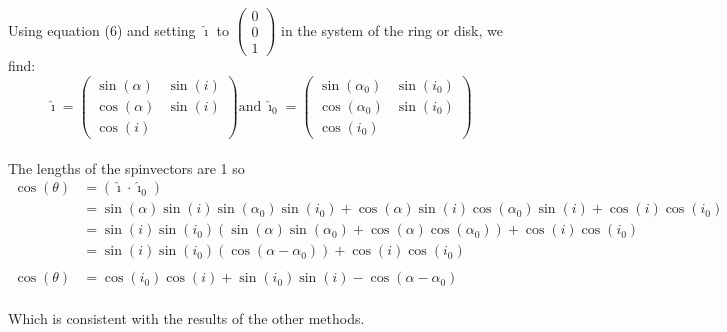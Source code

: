 \documentclass[11pt,a4paper]{article}
\newcommand{\sinb}[1]{\sin \left( #1 \right)}
\newcommand{\cosb}[1]{\cos \left( #1 \right)}
\begin{document}
Using equation (6) and setting $\hat \imath$ to $\left( \begin{array}{c}0\\0\\1\end{array}\right)$ in the system of the ring or disk, we find:\\
\begin{displaymath}
\hat \imath = \left( \begin{array}{cc}\sinb{\alpha} & \sinb{i} \\ \cosb{\alpha} & \sinb{i} \\ \cosb{i} & \end{array} \right) \mathrm{and}\  \hat \imath_0 = \left( \begin{array}{cc}\sinb{\alpha_0} & \sinb{i_0} \\ \cosb{\alpha_0} & \sinb{i_0}\\ \cosb{i_0} &
 \end{array} \right)
\end{displaymath}\\
The lengths of the spinvectors are 1 so\\
\begin{displaymath}
\begin{array}{rl}
\cosb{ \theta} &= (\hat \imath \cdot\hat \imath_0)\\
&= \sinb{\alpha} \sinb{i} \sinb{\alpha_0} \sinb{i_0} + \cosb{\alpha} \sinb{i} \cosb{\alpha_0} \sinb{i} + \cosb{i} \cosb{i_0} \\ &= \sinb{i} \sinb{i_0} (\sinb{\alpha} \sinb{\alpha_0} + \cosb{\alpha} \cosb{\alpha_0}) + \cosb{i}\cosb{i_0}\\
&= \sinb{i} \sinb{i_0} (\cosb{\alpha - \alpha_0} ) + \cosb{i} \cosb{i_0}\\
 & \\
\cosb{\theta} &= \cosb{i_0} \cosb{i} + \sinb{i_0} \sinb{i} - \cosb{ \alpha - \alpha_0}
\end{array}
\end{displaymath}\\
Which is consistent with the results of the other methods.
\pagebreak
\end{document}
